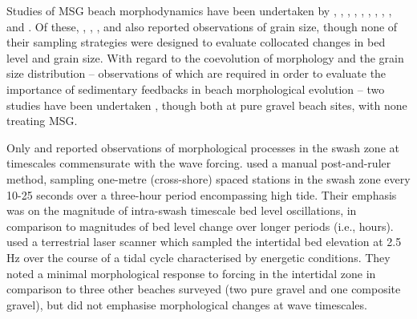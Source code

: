 

Studies of MSG beach morphodynamics have been undertaken by \citet{Pontee_etal2004}, \citet{Horn_Walton2004}, \citet{Ivamy_Kench2006}, \citet{Miller_etal2011}, \citet{Miller_Warrick2012}, \citet{Bramato_etal2012}, \citet{Roberts_etal2013}, \citet{Hay_etal2014}, \citet{Almeida_etal2014}, and \citet{Grottoli_etal2017}. Of these, \citet{Pontee_etal2004}, \citet{Miller_etal2011}, \citet{Miller_Warrick2012}, \citet{Roberts_etal2013} and \citet{Hay_etal2014} also reported observations of grain size, though none of their sampling strategies were designed to evaluate collocated changes in bed level and grain size. With regard to the coevolution of morphology and the grain size distribution -- observations of which are required in order to evaluate the importance of sedimentary feedbacks in beach morphological evolution -- two studies have been undertaken \citep{Masselink_etal2007, Austin_Buscombe2008}, though both at pure gravel beach sites, with none treating MSG.

Only \citet{Horn_Walton2004} and \citet{Almeida_etal2014} reported observations of morphological processes in the swash zone at timescales commensurate with the wave forcing. \citeauthor{Horn_Walton2004} used a manual post-and-ruler method, sampling one-metre (cross-shore) spaced stations in the swash zone every 10-25 seconds over a three-hour period encompassing high tide. Their emphasis was on the magnitude of intra-swash timescale bed level oscillations, in comparison to magnitudes of bed level change over longer periods (i.e., hours). \citeauthor{Almeida_etal2014} used a terrestrial laser scanner which sampled the intertidal bed elevation at 2.5 Hz over the course of a tidal cycle characterised by energetic conditions. They noted a minimal morphological response to forcing in the intertidal zone in comparison to three other beaches surveyed (two pure gravel and one composite gravel), but did not emphasise morphological changes at wave timescales. 


